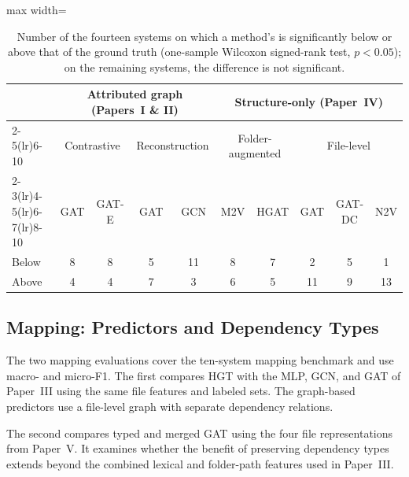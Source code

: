 \begin{table}[htb]
\centering
\caption[Recovered partitions compared with the ground truth in \tmq{}.]{Number of the fourteen systems on which a method's \tmq{} is significantly below or above that of the ground truth (one-sample Wilcoxon signed-rank test, $p<0.05$); on the remaining systems, the difference is not significant. \label{tab:gt_cohesion}}
\renewcommand{\arraystretch}{1.0}
\begin{adjustbox}{max width=\textwidth}
\begin{tabular}{@{} l cc cc cc ccc @{}}
\toprule
& \multicolumn{4}{c}{\textbf{Attributed graph (Papers~I \& II)}} & \multicolumn{5}{c}{\textbf{Structure-only (Paper~IV)}} \\
\cmidrule(lr){2-5}\cmidrule(lr){6-10}
& \multicolumn{2}{c}{Contrastive} & \multicolumn{2}{c}{Reconstruction} & \multicolumn{2}{c}{Folder-augmented} & \multicolumn{3}{c}{File-level} \\
\cmidrule(lr){2-3}\cmidrule(lr){4-5}\cmidrule(lr){6-7}\cmidrule(lr){8-10}
& GAT & GAT-E & GAT & GCN & M2V & HGAT & GAT & GAT-DC & N2V \\
\midrule
Below    & 8 & 8 & 5 & 11 & 8 & 7 & 2  & 5 & 1  \\
Above    & 4 & 4 & 7 & 3  & 6 & 5 & 11 & 9 & 13 \\
\bottomrule
\end{tabular}
\end{adjustbox}
\end{table}

\subsection{Mapping: Predictors and Dependency Types \label{sec:mapping_cross_study}}

The two mapping evaluations cover the ten-system mapping benchmark and use macro- and micro-F1. The first compares HGT with the MLP, GCN, and GAT of Paper~III using the same file features and labeled sets. The graph-based predictors use a file-level graph with separate dependency relations.

The second compares typed and merged GAT using the four file representations from Paper~V. It examines whether the benefit of preserving dependency types extends beyond the combined lexical and folder-path features used in Paper~III.


